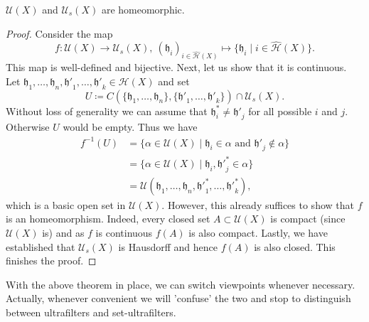 \begin{thm}
  \(\mathcal{U}(X)\) and \(\mathcal{U}_s(X)\) are homeomorphic.
\end{thm}

\begin{proof}
  Consider the map
  \[
    f\colon \mathcal{U}(X) \to \mathcal{U}_s(X),\ (\mathfrak{h}_i)_{i \in \mathcal{\hat H}(X)} \mapsto \{\mathfrak{h}_i \mid i \in \mathcal{\hat H}(X)\}.
  \]
  This map is well-defined and bijective. Next, let us show that it is continuous. Let \(\mathfrak{h}_1, \dots, \mathfrak{h}_n, \mathfrak{h'}_1, \dots,\mathfrak{h'}_k \in \mathcal{H}(X)\) and set
  \[
    U \coloneqq C(\{\mathfrak{h}_1, \dots, \mathfrak{h}_n\}, \{\mathfrak{h'}_1, \dots, \mathfrak{h'}_k\}) \cap \mathcal{U}_s(X).
  \]
  Without loss of generality we can assume that \(\mathfrak{h}^\ast_i \neq \mathfrak{h'}_j\) for all possible \(i\) and \(j\). Otherwise \(U\) would be empty. Thus we have
  \begin{align*}
    f^{-1}(U)
    & = \{\alpha \in \mathcal{U}(X) \mid \mathfrak{h}_i \in \alpha \text{ and } \mathfrak{h'}_j \notin \alpha\}\\
    & = \{\alpha \in \mathcal{U}(X) \mid \mathfrak{h}_i, \mathfrak{h'}^\ast_j \in \alpha\}\\
    & = \mathcal{U}(\mathfrak{h}_1, \dots, \mathfrak{h}_n, \mathfrak{h'}^\ast_1, \dots, \mathfrak{h'}^\ast_k),
  \end{align*}
  which is a basic open set in \(\mathcal{U}(X)\). However, this already suffices to show that \(f\) is an homeomorphism. Indeed, every closed set \(A \subset \mathcal{U}(X)\) is compact (since \(\mathcal{U}(X)\) is) and as \(f\) is continuous \(f(A)\) is also compact. Lastly, we have established that \(\mathcal{U}_s(X)\) is Hausdorff and hence \(f(A)\) is also closed. This finishes the proof.
\end{proof}

With the above theorem in place, we can switch viewpoints whenever necessary. Actually, whenever convenient we will 'confuse' the two and stop to distinguish between ultrafilters and set-ultrafilters.

